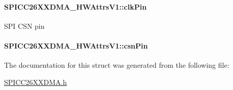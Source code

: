 \paragraph[{clk\+Pin}]{ S\+P\+I\+C\+C26\+X\+X\+D\+M\+A\+\_\+\+H\+W\+Attrs\+V1\+::clk\+Pin}\label{struct_s_p_i_c_c26_x_x_d_m_a___h_w_attrs_v1_adcdbba63f9164524601115195754ccaa}
S\+P\+I C\+S\+N pin 
\paragraph[{csn\+Pin}]{ S\+P\+I\+C\+C26\+X\+X\+D\+M\+A\+\_\+\+H\+W\+Attrs\+V1\+::csn\+Pin}\label{struct_s_p_i_c_c26_x_x_d_m_a___h_w_attrs_v1_ae6f53f93617b30ba7a3026cac95822e3}


The documentation for this struct was generated from the following file\+:\begin{DoxyCompactItemize}
\item 
\hyperlink{_s_p_i_c_c26_x_x_d_m_a_8h}{S\+P\+I\+C\+C26\+X\+X\+D\+M\+A.\+h}\end{DoxyCompactItemize}
